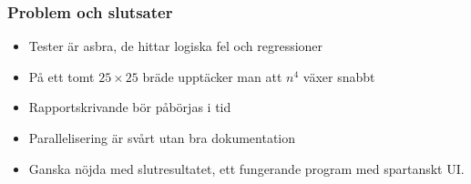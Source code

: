 \documentclass{beamer}
\begin{document}
\begin{frame}
  \frametitle{Problem och slutsater}

  \begin{itemize}
  \item Tester är asbra, de hittar logiska fel och regressioner
  \item På ett tomt $25\times 25$ bräde upptäcker man att $n^4$ växer snabbt
  \item Rapportskrivande bör påbörjas i tid
  \item Parallelisering \"ar sv\aa rt utan bra dokumentation
  \item Ganska nöjda med slutresultatet, ett fungerande program med spartanskt UI.
  \end{itemize}
\end{frame}
\end{document}
